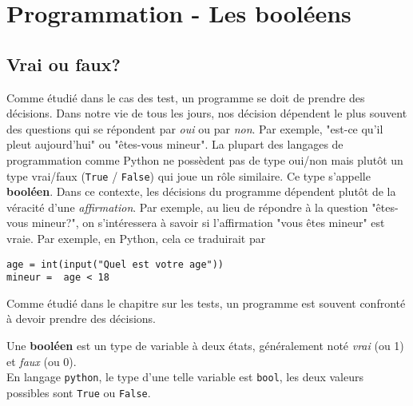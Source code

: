 \documentclass[11pt, a4paper]{book}
\begin{document}
\setcounter{chapter}{7}

\chapter{Programmation - Les booléens}

\vspace{-0.8cm}
\section{Vrai ou faux?}
Comme étudié dans le cas des test, un programme se doit de prendre des décisions. Dans notre vie de tous les jours, nos décision dépendent le plus souvent des questions qui se répondent par \textit{oui} ou par \textit{non}. Par exemple, "est-ce qu'il pleut aujourd'hui" ou "êtes-vous mineur". La plupart des langages de programmation comme Python ne possèdent pas de type oui/non mais plutôt un type vrai/faux (\lstinline{True} / \lstinline{False}) qui joue un rôle similaire. Ce type s'appelle \textbf{booléen}. Dans ce contexte, les décisions du programme dépendent plutôt de la véracité d'une \textit{affirmation}. Par exemple, au lieu de répondre à la question "êtes-vous mineur?", on s'intéressera à savoir si l'affirmation "vous êtes mineur" est vraie. Par exemple, en Python, cela ce traduirait par 
\begin{lstlisting}[numbers=none]
age = int(input("Quel est votre age"))
mineur =  age < 18
\end{lstlisting}

Comme étudié dans le chapitre sur les tests, un programme est souvent confronté à devoir prendre des décisions. 
\begin{mydefinition}
	Une \textbf{booléen} est un type de variable à deux états, généralement noté \textit{vrai} (ou 1) et \textit{faux} (ou 0). \\
	
	En langage \lstinline{python},  le type d’une telle variable est \lstinline{bool}, les deux valeurs possibles sont \lstinline{True} ou \lstinline{False}.
\end{mydefinition}
\end{document}
